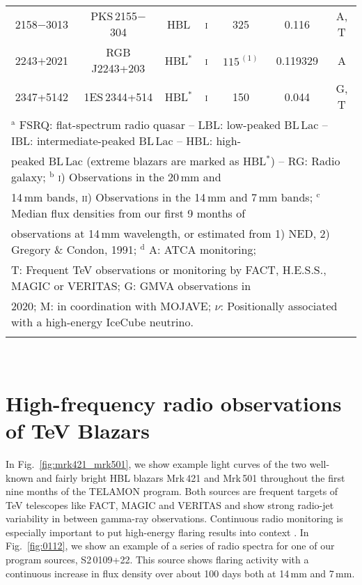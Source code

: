 \documentclass[a4paper,11pt]{article}
\begin{document}
\begin{table}[hbt]
\begin{tabular}{@{}cccccc@{\,\,}c@{\,}}
2158$-$3013 & PKS\,2155$-$304 & HBL & \textsc{i} & 325 & 0.116 & A, T\\
2243$+$2021 & RGB J2243+203 & HBL$^*$ & \textsc{i} & $115^{\,(1)}$ & 0.119329  & A\\
2347+5142 & 1ES\,2344+514 & HBL$^*$ & \textsc{i} & 150 & 0.044 & G, T\\
\hline
\multicolumn{7}{l}{\footnotesize 
$^\textrm{a}$ FSRQ: flat-spectrum radio quasar -- LBL: low-peaked BL\,Lac -- IBL: intermediate-peaked BL\,Lac -- HBL: high-
} \\
\multicolumn{7}{l}{\footnotesize 
 peaked BL\,Lac (extreme blazars are marked as HBL$^*$) -- RG: Radio galaxy; $^\textrm{b}$ \textsc{i)} Observations in the 20\,mm and 
} \\
\multicolumn{7}{l}{\footnotesize 14\,mm bands, \textsc{ii)} Observations in the 14\,mm and 7\,mm bands;
$^\textrm{c}$ Median flux densities from our first 9 months of 
} \\
\multicolumn{7}{l}{\footnotesize observations at 14\,mm wavelength, or estimated from 1) NED, 2) Gregory \& Condon, 1991; $^\textrm{d}$ A: ATCA monitoring;   
} \\
\multicolumn{7}{l}{\footnotesize T: Frequent TeV observations or monitoring
by FACT, H.E.S.S., MAGIC or VERITAS; G: GMVA observations in 
}\\
\multicolumn{7}{l}{\footnotesize 2020; M: in coordination with MOJAVE; $\nu$: Positionally   associated with a high-energy IceCube neutrino.
}\\
\multicolumn{7}{l}{\footnotesize  
}\\
\end{tabular}
\\
\label{tab:sources}
\end{table}


\normalsize

\section{High-frequency radio observations of TeV Blazars}
\noindent
In Fig.~\ref{fig:mrk421_mrk501}, we show example light curves of the two well-known and fairly bright HBL blazars Mrk\,421 and Mrk\,501 throughout the first nine months of the TELAMON program. Both sources are frequent targets of TeV telescopes like FACT, MAGIC and VERITAS and show strong radio-jet variability in between gamma-ray observations. Continuous radio monitoring is especially important to put high-energy flaring results into context \cite[e.g.,][these proceedings]{gokus2021}.
In Fig.~\ref{fig:0112}, we show an example of a series of radio spectra for one of our program sources, S2\,0109+22.
This source shows flaring activity with a continuous increase in flux density over about 100 days both at 14\,mm and 7\,mm.
\end{document}
